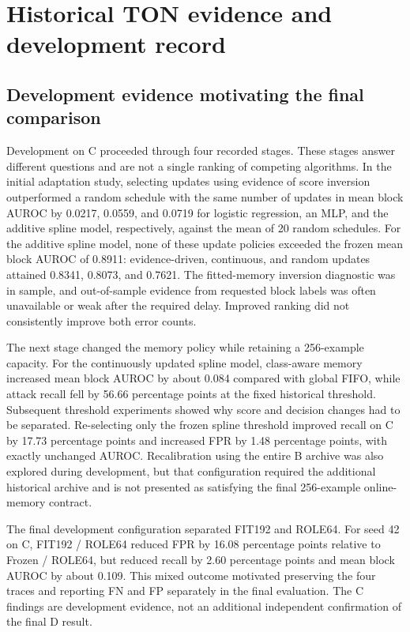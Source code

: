 \section{Historical TON evidence and development record}
\subsection{Development evidence motivating the final comparison}
Development on C proceeded through four recorded stages. These stages answer different questions and are not a single ranking of competing algorithms. In the initial adaptation study, selecting updates using evidence of score inversion outperformed a random schedule with the same number of updates in mean block AUROC by 0.0217, 0.0559, and 0.0719 for logistic regression, an MLP, and the additive spline model, respectively, against the mean of 20 random schedules. For the additive spline model, none of these update policies exceeded the frozen mean block AUROC of 0.8911: evidence-driven, continuous, and random updates attained 0.8341, 0.8073, and 0.7621. The fitted-memory inversion diagnostic was in sample, and out-of-sample evidence from requested block labels was often unavailable or weak after the required delay. Improved ranking did not consistently improve both error counts.

The next stage changed the memory policy while retaining a 256-example capacity. For the continuously updated spline model, class-aware memory increased mean block AUROC by about 0.084 compared with global FIFO, while attack recall fell by 56.66 percentage points at the fixed historical threshold. Subsequent threshold experiments showed why score and decision changes had to be separated. Re-selecting only the frozen spline threshold improved recall on C by 17.73 percentage points and increased FPR by 1.48 percentage points, with exactly unchanged AUROC. Recalibration using the entire B archive was also explored during development, but that configuration required the additional historical archive and is not presented as satisfying the final 256-example online-memory contract.

The final development configuration separated FIT192 and ROLE64. For seed 42 on C, FIT192 / ROLE64 reduced FPR by 16.08 percentage points relative to Frozen / ROLE64, but reduced recall by 2.60 percentage points and mean block AUROC by about 0.109. This mixed outcome motivated preserving the four traces and reporting FN and FP separately in the final evaluation. The C findings are development evidence, not an additional independent confirmation of the final D result.

